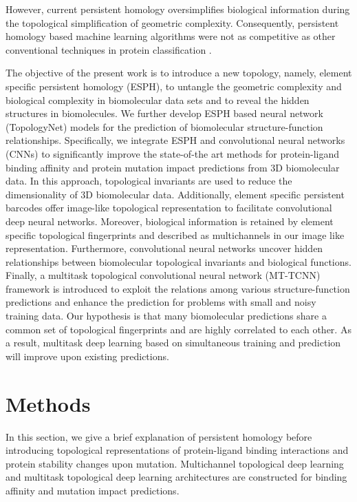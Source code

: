 \documentclass[10pt]{article}
\begin{document}
	
However, current persistent homology oversimplifies biological information during the topological simplification of geometric complexity. 
Consequently, persistent homology based machine learning algorithms  were not as competitive as other conventional techniques in protein classification  \cite{ZXCang:2015, kusano2016persistence}. 

The objective of the present work is to introduce a new topology, namely, element specific persistent homology (ESPH), to untangle the geometric complexity and biological complexity in biomolecular data sets and to reveal the hidden structures in biomolecules. We further  develop ESPH based neural network (TopologyNet) models  for the prediction of   biomolecular structure-function relationships.  Specifically, we integrate ESPH and  convolutional neural networks (CNNs) to significantly improve the state-of-the art methods for protein-ligand binding affinity and protein mutation impact predictions from 3D biomolecular data. In this approach, topological invariants are used to reduce the dimensionality of  3D biomolecular data. Additionally, element specific persistent barcodes offer  image-like topological representation to facilitate convolutional deep neural networks. Moreover, biological information is retained by 
element specific topological fingerprints and described as multichannels in our image like representation. Furthermore,  convolutional   neural networks uncover hidden relationships between biomolecular topological invariants and biological functions. Finally, a multitask  topological convolutional   neural network (MT-TCNN) framework is introduced  to exploit the relations among various  structure-function predictions and enhance the prediction for problems with  small and noisy training data. Our hypothesis is that many biomolecular predictions share a common set of topological fingerprints and are highly correlated  to each other. As a result, multitask deep learning based on simultaneous training and prediction will improve upon existing predictions.

\section{Methods}\label{sec:methods}
In this section, we give a brief explanation of persistent homology \cite{Edelsbrunner:2002,Zomorodian:2005} before introducing topological representations of protein-ligand binding interactions and protein   stability changes upon mutation.  
Multichannel topological deep learning and multitask topological deep learning architectures are constructed for binding affinity and mutation impact predictions. 
\end{document}
